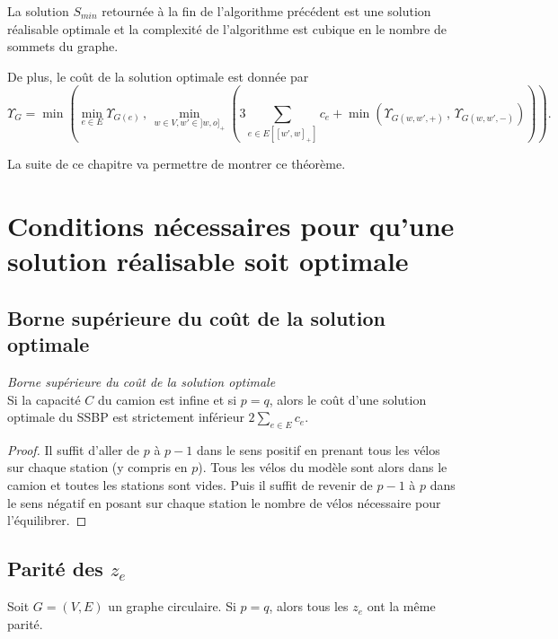 \begin{thm} \label{thm: optimalité algo infini}
La solution $S_{min}$ retournée à la fin de l'algorithme précédent est une solution réalisable optimale et la complexité de l'algorithme est cubique en le nombre de sommets du graphe.

De plus, le coût de la solution optimale est donnée par
$$
\Upsilon_{G} = \min
\left(
  \min_{e \in E} \Upsilon_{G(e)}\,,\,
  \min_{w \in V, w' \in ]w,o]_+}
  \left(
    3 \sum_{ e \in E\left[ \left[w',w\right]_+ \right] }c_e + \min \left( \Upsilon_{G(w,w',+)} \,,\, \Upsilon_{G(w,w',-)} \right)
  \right)
\right).
$$
\end{thm}

La suite de ce chapitre va permettre de montrer ce théorème.

\section{Conditions nécessaires pour qu'une solution réalisable soit optimale}

\subsection{Borne supérieure du coût de la solution optimale}

\begin{lem}\label{capacite infinie - borne sup cout}
\emph{Borne supérieure du coût de la solution optimale}\\
Si la capacité $C$ du camion est infine et si $p=q$, alors le coût d'une solution optimale du SSBP est strictement inférieur $\displaystyle 2\sum_{e \in E}c_e$.
\end{lem}

\begin{proof}
Il suffit d'aller de $p$ à $p-1$ dans le sens positif en prenant tous les vélos sur chaque station (y compris en $p$). Tous les vélos du modèle sont alors dans le camion et toutes les stations sont vides. Puis il suffit de revenir de $p-1$ à $p$ dans le sens négatif en posant sur chaque station le nombre de vélos nécessaire pour l'équilibrer.
\end{proof}

\subsection{Parité des $z_e$}

\begin{prop}\label{parité des Ze}
Soit $G=(V,E)$ un graphe circulaire. Si $p=q$, alors tous les $z_e$ ont la même parité.
\end{prop}

